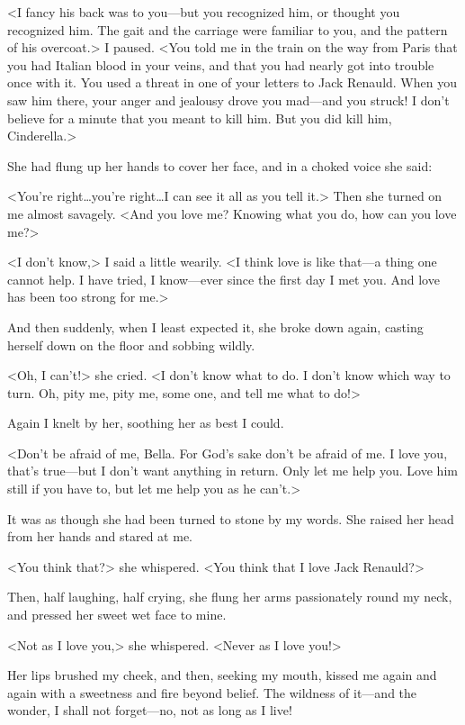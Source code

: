  <I fancy his back was to you—but you recognized him, or thought you recognized him. The gait and the carriage were familiar to you, and the pattern of his overcoat.> I paused. <You told me in the train on the way from Paris that you had Italian blood in your veins, and that you had nearly got into trouble once with it. You used a threat in one of your letters to Jack Renauld. When you saw him there, your anger and jealousy drove you mad—and you struck! I don't believe for a minute that you meant to kill him. But you did kill him, Cinderella.> 

 She had flung up her hands to cover her face, and in a choked voice she said: 

 <You're right\dots you're right\dots I can see it all as you tell it.> Then she turned on me almost savagely. <And you love me? Knowing what you do, how can you love me?> 

 <I don't know,> I said a little wearily. <I think love is like that—a thing one cannot help. I have tried, I know—ever since the first day I met you. And love has been too strong for me.> 

 And then suddenly, when I least expected it, she broke down again, casting herself down on the floor and sobbing wildly. 

 <Oh, I can't!> she cried. <I don't know what to do. I don't know which way to turn. Oh, pity me, pity me, some one, and tell me what to do!> 

 Again I knelt by her, soothing her as best I could. 

 <Don't be afraid of me, Bella. For God's sake don't be afraid of me. I love you, that's true—but I don't want anything in return. Only let me help you. Love him still if you have to, but let me help you as he can't.> 

 It was as though she had been turned to stone by my words. She raised her head from her hands and stared at me. 

 <You think that?> she whispered. <You think that I love Jack Renauld?> 

 Then, half laughing, half crying, she flung her arms passionately round my neck, and pressed her sweet wet face to mine. 

 <Not as I love you,> she whispered. <Never as I love you!> 

 Her lips brushed my cheek, and then, seeking my mouth, kissed me again and again with a sweetness and fire beyond belief. The wildness of it—and the wonder, I shall not forget—no, not as long as I live! 

